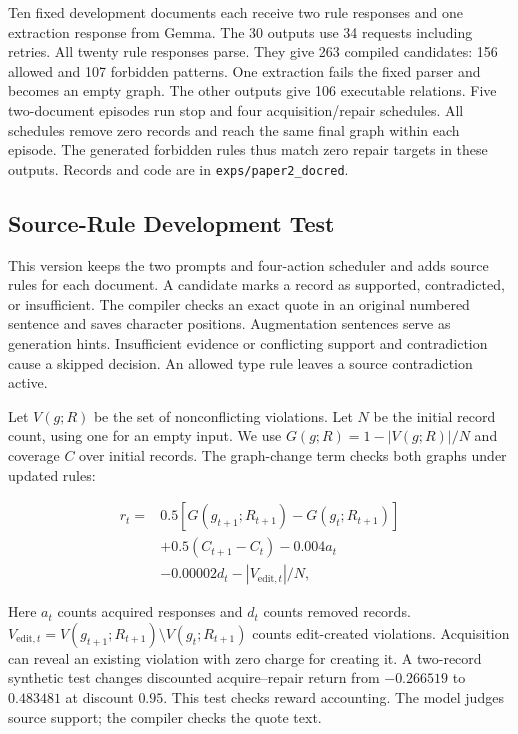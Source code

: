 Ten fixed development documents each receive two rule responses and one
extraction response from Gemma. The 30 outputs use 34 requests including
retries. All twenty rule responses parse. They give 263 compiled candidates:
156 allowed and 107 forbidden patterns. One extraction fails the fixed
parser and becomes an empty graph. The other outputs give 106 executable
relations. Five two-document episodes run stop and four acquisition/repair
schedules. All schedules remove zero records and reach the same final
graph within each episode. The generated forbidden rules thus match zero
repair targets in these outputs. Records and code are in
\texttt{exps/paper2\_docred}.

\subsection{Source-Rule Development Test}

\label{app:docred_v2}

This version keeps the two prompts and four-action scheduler and adds
source rules for each document. A candidate marks a record as supported,
contradicted, or insufficient. The compiler checks an exact quote in
an original numbered sentence and saves character positions.
Augmentation sentences serve as generation hints. Insufficient evidence
or conflicting support and contradiction cause a skipped decision.
An allowed type rule leaves a source contradiction active.

Let $V(g;R)$ be the set of nonconflicting violations. Let $N$ be the
initial record count, using one for an empty input.
We use $G(g;R)=1-|V(g;R)|/N$ and coverage $C$ over initial records.
The graph-change term checks both graphs under updated rules:

\begin{align}
r_t={}&0.5\left[G(g_{t+1};R_{t+1})-G(g_t;R_{t+1})\right] \nonumber\\
&+0.5(C_{t+1}-C_t)-0.004a_t \nonumber\\
&-0.00002d_t-|V_{\mathrm{edit},t}|/N,
\end{align}

Here $a_t$ counts acquired responses and $d_t$ counts removed records.
$V_{\mathrm{edit},t}=V(g_{t+1};R_{t+1})\setminus V(g_t;R_{t+1})$ counts
edit-created violations. Acquisition can reveal an existing violation
with zero charge for creating it. A two-record synthetic test changes
discounted acquire--repair return from $-0.266519$ to $0.483481$
at discount $0.95$. This test checks reward accounting. The model judges
source support; the compiler checks the quote text.

